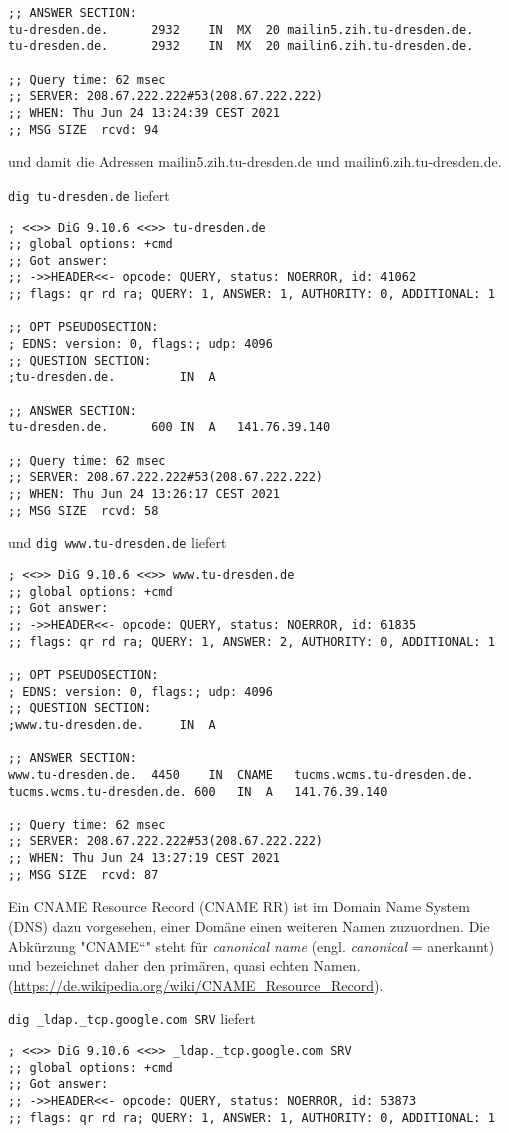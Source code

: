 \documentclass{article}
\begin{document}
\begin{enumerate}[label=(\alph*)]
\begin{lstlisting}[tabsize=2]
;; ANSWER SECTION:
tu-dresden.de.		2932	IN	MX	20 mailin5.zih.tu-dresden.de.
tu-dresden.de.		2932	IN	MX	20 mailin6.zih.tu-dresden.de.

;; Query time: 62 msec
;; SERVER: 208.67.222.222#53(208.67.222.222)
;; WHEN: Thu Jun 24 13:24:39 CEST 2021
;; MSG SIZE  rcvd: 94
		\end{lstlisting}
		und damit die Adressen mailin5.zih.tu-dresden.de und mailin6.zih.tu-dresden.de. 
		
		\texttt{dig tu-dresden.de} liefert
		\begin{lstlisting}[tabsize=2]
; <<>> DiG 9.10.6 <<>> tu-dresden.de
;; global options: +cmd
;; Got answer:
;; ->>HEADER<<- opcode: QUERY, status: NOERROR, id: 41062
;; flags: qr rd ra; QUERY: 1, ANSWER: 1, AUTHORITY: 0, ADDITIONAL: 1

;; OPT PSEUDOSECTION:
; EDNS: version: 0, flags:; udp: 4096
;; QUESTION SECTION:
;tu-dresden.de.			IN	A

;; ANSWER SECTION:
tu-dresden.de.		600	IN	A	141.76.39.140

;; Query time: 62 msec
;; SERVER: 208.67.222.222#53(208.67.222.222)
;; WHEN: Thu Jun 24 13:26:17 CEST 2021
;; MSG SIZE  rcvd: 58
		\end{lstlisting}
		und \texttt{dig www.tu-dresden.de} liefert
		\begin{lstlisting}[tabsize=2]
; <<>> DiG 9.10.6 <<>> www.tu-dresden.de
;; global options: +cmd
;; Got answer:
;; ->>HEADER<<- opcode: QUERY, status: NOERROR, id: 61835
;; flags: qr rd ra; QUERY: 1, ANSWER: 2, AUTHORITY: 0, ADDITIONAL: 1

;; OPT PSEUDOSECTION:
; EDNS: version: 0, flags:; udp: 4096
;; QUESTION SECTION:
;www.tu-dresden.de.		IN	A

;; ANSWER SECTION:
www.tu-dresden.de.	4450	IN	CNAME	tucms.wcms.tu-dresden.de.
tucms.wcms.tu-dresden.de. 600	IN	A	141.76.39.140

;; Query time: 62 msec
;; SERVER: 208.67.222.222#53(208.67.222.222)
;; WHEN: Thu Jun 24 13:27:19 CEST 2021
;; MSG SIZE  rcvd: 87
		\end{lstlisting}
		Ein CNAME Resource Record (CNAME RR) ist im Domain Name System (DNS) dazu vorgesehen, einer Domäne einen weiteren Namen zuzuordnen. Die Abkürzung "CNAME“" steht für \textit{canonical name} (engl. \textit{canonical} = anerkannt) und bezeichnet daher den primären, quasi echten Namen. (\url{https://de.wikipedia.org/wiki/CNAME_Resource_Record}). 
		
		\texttt{dig \_ldap.\_tcp.google.com SRV} liefert
		\begin{lstlisting}[tabsize=2]
; <<>> DiG 9.10.6 <<>> _ldap._tcp.google.com SRV
;; global options: +cmd
;; Got answer:
;; ->>HEADER<<- opcode: QUERY, status: NOERROR, id: 53873
;; flags: qr rd ra; QUERY: 1, ANSWER: 1, AUTHORITY: 0, ADDITIONAL: 1


\end{lstlisting}
\end{enumerate}
\end{document}
